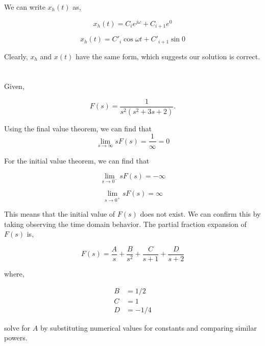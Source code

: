 \documentclass[12pt]{article}
\numberwithin{equation}{section}
\begin{document}
  We can write $ x_h(t) $ as,

  \begin{equation}
    x_h(t) = C_i e^{j\omega} + C_{i+1} e^{0}
  \end{equation}

  \begin{equation}
    x_h(t) = C'_i \cos\omega t + C'_{i+1} \sin 0
  \end{equation}

  Clearly, $ x_h $ and $ x(t) $ have the same form, which suggests our solution is correct.

  \section{}

  Given,

  \[
      F(s) = \frac{1}{s ^2 (s ^2 + 3s + 2)}
    .\]

  Using the final value theorem, we can find that
  \begin{equation}
    \lim_{s \rightarrow \infty} sF(s) = \frac{1}{\infty} = 0
  \end{equation}

  For the initial value theorem, we can find that

  \begin{equation}
    \lim_{s \rightarrow 0^-} sF(s) = -\infty
  \end{equation}

  \begin{equation}
    \lim_{s \rightarrow 0^+} sF(s) = \infty
  \end{equation}

  This means that the initial value of $ F(s) $ does not exist. We can confirm this by taking observing the time domain behavior. The partial fraction expansion of $ F(s) $ is,

  \begin{equation}
    F(s) = \frac{A}{s} + \frac{B}{s^2} + \frac{C}{s + 1} + \frac{D}{s + 2}
  \end{equation}

  where,

  \begin{align}
    B &= 1/2 \\
    C &= 1 \\
    D &= -1/4
  \end{align}

  solve for $ A $ by substituting numerical values for constants and comparing similar powers.
\end{document}
